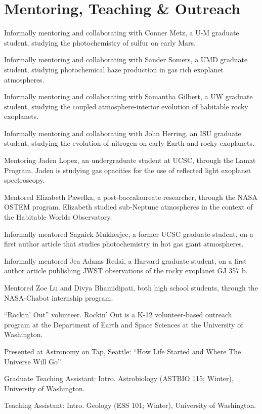 \documentclass[12pt]{article}
\begin{document}
\section{Mentoring, Teaching \& Outreach}

\begin{cvlist}
\item[2024 - pres.]
  Informally mentoring and collaborating with Conner Metz, a U-M graduate student, studying the photochemistry of sulfur on early Mars.
\item[2024 - pres.]
  Informally mentoring and collaborating with Sander Somers, a UMD graduate student, studying photochemical haze production in gas rich exoplanet atmospheres.
\item[2024 - pres.]
  Informally mentoring and collaborating with Samantha Gilbert, a UW graduate student, studying the coupled atmosphere-interior evolution of habitable rocky exoplanets.
\item[2024 - pres.]
  Informally mentoring and collaborating with John Herring, an ISU graduate student, studying the evolution of nitrogen on early Earth and rocky exoplanets.
\item[2025 - pres.]
  Mentoring Jaden Lopez, an undergraduate student at UCSC, through the Lamat Program. Jaden is studying gas opacities for the use of reflected light exoplanet spectroscopy.
\item[2025]
  Mentored Elizabeth Pawelka, a post-baccalaureate researcher, through the NASA OSTEM program. Elizabeth studied sub-Neptune atmospheres in the context of the Habitable Worlds Observatory.
\item[2024 - 2025]
  Informally mentored Sagnick Mukherjee, a former UCSC graduate student, on a first author article that studies photochemistry in hot gas giant atmospheres.
\item[2024 - 2025]
  Informally mentored Jea Adams Redai, a Harvard graduate student, on a first author article publishing JWST observations of the rocky exoplanet GJ 357 b.
\item[2024]
  Mentored Zoe Lu and Divya Bhamidipati, both high school students, through the NASA-Chabot internship program.
\item[2022 - 2023]
  ``Rockin' Out'' volunteer. Rockin' Out is a K-12 volunteer-based outreach program at the Department of Earth and Space Sciences at the University of Washington.
\item[2022]
  Presented at Astronomy on Tap, Seattle: ``How Life Started and Where The Universe Will Go''
\item[2019]
  Graduate Teaching Assistant: Intro. Astrobiology (ASTBIO 115; Winter), University of Washington.
\item[2018]
  Teaching Assistant: Intro. Geology (ESS 101; Winter), University of Washington.
\end{cvlist}
\end{document}
